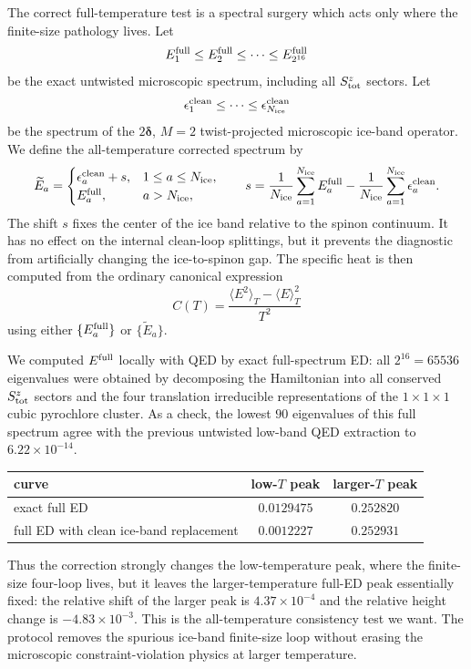 \documentclass[11pt,letterpaper]{article}
\newcommand{\bdelta}{\bm \delta}
\theoremstyle{plain}
\theoremstyle{definition}
\begin{document}
The correct full-temperature test is a spectral surgery which acts only where
the finite-size pathology lives.  Let
\[
E^{\rm full}_1\le E^{\rm full}_2\le \cdots \le E^{\rm full}_{2^{16}}
\]
be the exact untwisted microscopic spectrum, including all $S^z_{\rm tot}$
sectors.  Let
\[
\epsilon^{\rm clean}_1\le\cdots\le \epsilon^{\rm clean}_{N_{\rm ice}}
\]
be the spectrum of the $2\bdelta$, $M=2$ twist-projected microscopic ice-band
operator.  We define the all-temperature corrected spectrum by
\begin{equation}
\label{eq:allT_spectral_replacement}
\widetilde E_a =
\begin{cases}
\epsilon^{\rm clean}_a+s,&1\le a\le N_{\rm ice},\\
E^{\rm full}_a,&a>N_{\rm ice},
\end{cases}
\qquad
s =
\frac{1}{N_{\rm ice}}\sum_{a=1}^{N_{\rm ice}}E^{\rm full}_a
-
\frac{1}{N_{\rm ice}}\sum_{a=1}^{N_{\rm ice}}\epsilon^{\rm clean}_a .
\end{equation}
The shift $s$ fixes the center of the ice band relative to the spinon
continuum.  It has no effect on the internal clean-loop splittings, but it
prevents the diagnostic from artificially changing the ice-to-spinon gap.  The
specific heat is then computed from the ordinary canonical expression
\[
C(T)=\frac{\langle E^2\rangle_T-\langle E\rangle_T^2}{T^2}
\]
using either $\{E^{\rm full}_a\}$ or $\{\widetilde E_a\}$.

We computed $E^{\rm full}$ locally with QED by exact full-spectrum ED: all
$2^{16}=65536$ eigenvalues were obtained by decomposing the Hamiltonian into
all conserved $S^z_{\rm tot}$ sectors and the four translation irreducible
representations of the $1\times1\times1$ cubic pyrochlore cluster.  As a
check, the lowest $90$ eigenvalues of this full spectrum agree with the
previous untwisted low-band QED extraction to
$6.22\times 10^{-14}$.

\begin{center}
\begin{tabular}{lcc}
\toprule
curve & low-$T$ peak & larger-$T$ peak\\
\midrule
exact full ED & $0.0129475$ & $0.252820$\\
full ED with clean ice-band replacement & $0.0012227$ & $0.252931$\\
\bottomrule
\end{tabular}
\end{center}

Thus the correction strongly changes the low-temperature peak, where the
finite-size four-loop lives, but it leaves the larger-temperature full-ED peak
essentially fixed: the relative shift of the larger peak is
$4.37\times10^{-4}$ and the relative height change is $-4.83\times10^{-3}$.
This is the all-temperature consistency test we want.  The protocol removes the
spurious ice-band finite-size loop without erasing the microscopic
constraint-violation physics at larger temperature.
\end{document}
